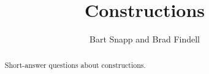 \documentclass[nooutcomes]{ximera}
\title{Constructions}
\author{Bart Snapp and Brad Findell}
\begin{document}
\begin{abstract}
Short-answer questions about constructions. 
\end{abstract}
\maketitle

%
\end{document}
